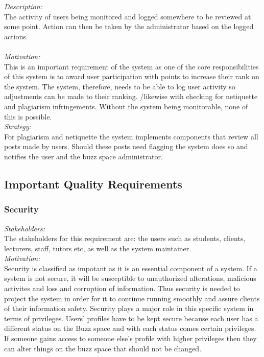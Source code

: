 \documentclass[a4paper,12pt]{report}
\begin{document}
		\emph{Description: }\\ The activity of users being monitored and logged somewhere to be reviewed at some point. Action can then be taken by the administrator based on the logged actions. \\	
		\\\emph{Motivation: }\\ This is an important requirement of the system as one of the core responsibilities of this system is to award user participation with points to increase their rank on the system. The system, therefore, needs to be able to log user activity so adjustments can be made to their ranking. /likewise with checking for netiquette and plagiarism infringements. Without the system being monitorable, none of this is possible. \\
		
		\emph{Strategy: }\\
		For plagiarism and netiquette the system implements components that review all posts made by users. Should these posts need flagging the system does so and notifies the user and the buzz space administrator. 
		
	\subsection{Important Quality Requirements}
		\subsubsection{Security}
		\emph{Stakeholders: }\\ The stakeholders for this requirement are: the users such as students, clients, lecturers, staff, tutors etc,  as well as the system maintainer.\\
		
		\emph{Motivation: }\\ Security is classified as impotant as it is an essential component of a system. If a system is not secure, it will be susceptible to unauthorized alterations, malicious activites and loss and corruption of information. Thus security is needed to project the system in order for it to continue running smoothly and assure clients of their information safety. Security plays a major role in this specific system in terms of privileges. Users' profiles have to be kept secure because each user has a different status on the Buzz space and with each status comes certain privileges. If someone gains access to someone else's profile with higher privileges then they can alter things on the buzz space that should not be changed. \\
		
\end{document}
